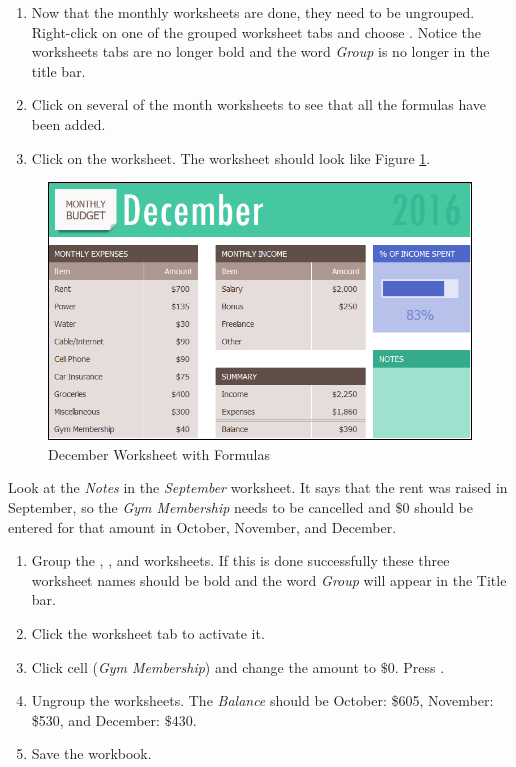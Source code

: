 \begin{enumbox}
	\begin{enumerate}
		\item Now that the monthly worksheets are done, they need to be ungrouped. Right-click on one of the grouped worksheet tabs and choose . Notice the worksheets tabs are no longer bold and the word \textit{Group} is no longer in the title bar.
		\item Click on several of the month worksheets to see that all the formulas have been added.
		\item Click on the  worksheet. The worksheet should look like Figure \ref{06:fig06}.
	\end{enumerate}
\end{enumbox}
	
\begin{figure}[H]
	\centering
	\includegraphics[width=\maxwidth{.95\linewidth}]{gfx/ch06_fig06}
	\caption{December Worksheet with Formulas}
	\label{06:fig06}
\end{figure}

Look at the \textit{Notes} in the \textit{September} worksheet. It says that the rent was raised in September, so the \textit{Gym Membership} needs to be cancelled and $ \$0 $ should be entered for that amount in October, November, and December.

\begin{enumbox}
	\begin{enumerate}
		\item Group the , , and  worksheets. If this is done successfully these three worksheet names should be bold and the word \textit{Group} will appear in the Title bar.
		\item Click the  worksheet tab to activate it.
		\item Click cell  (\textit{Gym Membership}) and change the amount to $ \$0 $. Press .
		\item Ungroup the worksheets. The \textit{Balance} should be October: \$605, November: \$530, and December: $ \$430 $.
		\item Save the  workbook.
	\end{enumerate}
\end{enumbox}

